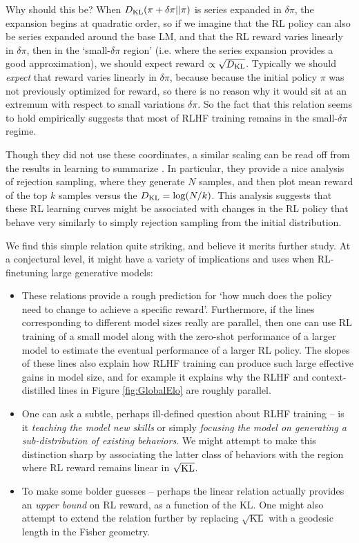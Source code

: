 Why should this be?  When $D_{\rm KL}(\pi + \delta \pi || \pi)$ is series expanded in $\delta \pi$, the expansion begins at quadratic order, so if we imagine that the RL policy can also be series expanded around the base LM, and that the RL reward varies linearly in $\delta \pi$, then in the `small-$\delta \pi$ region' (i.e. where the series expansion provides a good approximation), we should expect reward $\propto \sqrt{D_{\rm KL}}$.  Typically we should \emph{expect} that reward varies linearly in $\delta \pi$,  because  because the initial policy $\pi$ was not previously optimized for reward, so there is no reason why it would sit at an extremum with respect to small variations $\delta \pi$.  So the fact that this relation seems to hold empirically suggests that most of RLHF training remains in the small-$\delta \pi$ regime.

Though they did not use these coordinates, a similar scaling can be read off from the results in learning to summarize \cite{stiennon2020learning}.  In particular, they provide a nice analysis of rejection sampling, where they generate $N$ samples, and then plot mean reward of the top $k$ samples versus the $D_{\rm KL} = \log(N/k)$.  This analysis  suggests that these RL learning curves might be associated with changes in the RL policy that behave very similarly to simply rejection sampling from the initial distribution.  

We find this simple relation quite striking, and believe it merits  further study.  At a conjectural level, it might have a variety of implications and uses when RL-finetuning large generative models:

\begin{itemize}
\item These relations provide a rough prediction for `how much does the policy need to change to achieve a specific reward'.  Furthermore, if the lines corresponding to different model sizes really are parallel, then one can use RL training of a small model along with the zero-shot performance of a larger model to estimate the eventual performance of a larger RL policy.  The slopes of these lines also explain how RLHF training can produce such large effective gains in model size, and for example it explains why the RLHF and context-distilled lines in Figure \ref{fig:GlobalElo} are roughly parallel.
\item One can ask a subtle, perhaps ill-defined question about RLHF training -- is it \emph{teaching the model new skills} or simply \emph{focusing the model on generating a sub-distribution of existing behaviors}.  We might attempt to make this distinction sharp by associating the latter class of behaviors with the region where RL reward remains linear in $\sqrt{\rm KL}$. 

\item To make some bolder guesses -- perhaps the linear relation actually provides an \emph{upper bound} on RL reward, as a function of the KL.  One might also attempt to extend the relation further by replacing $\sqrt{\mathrm{KL}}$ with a geodesic length in the Fisher geometry.
\end{itemize}

